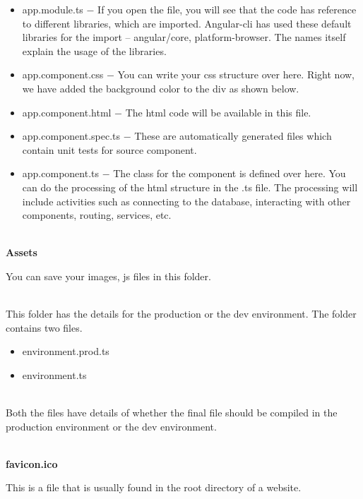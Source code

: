 \documentclass{article}
\begin{document}
\begin{itemize}
	\item app.module.ts $\mathrm{-}$ If you open the file, you will see that the code has reference to different libraries, which are imported. Angular-cli has used these default libraries for the import -- angular/core, platform-browser. The names itself explain the usage of the libraries.
	\item app.component.css $\mathrm{-}$ You can write your css structure over here. Right now, we have added the background color to the div as shown below.
	\item app.component.html $\mathrm{-}$ The html code will be available in this file. 
	\item app.component.spec.ts $\mathrm{-}$ These are automatically generated files which contain unit tests for source component.
	\item app.component.ts $\mathrm{-}$ The class for the component is defined over here. You can do the processing of the html structure in the .ts file. The processing will include activities such as connecting to the database, interacting with other components, routing, services, etc.
\end{itemize}


\noindent \\ {\large \textbf{Assets}}

\noindent You can save your images, js files in this folder.

\noindent 


\noindent \\ This folder has the details for the production or the dev environment. The folder contains two files.

\begin{itemize}
	\item environment.prod.ts
	 \item environment.ts
\end{itemize}
 
\noindent \\ Both the files have details of whether the final file should be compiled in the production environment or the dev environment.

\noindent \\ \textbf{favicon.ico}

\noindent This is a file that is usually found in the root directory of a website.
\end{document}
